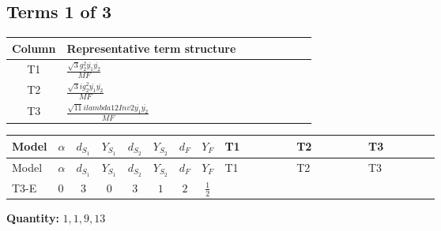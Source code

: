 \documentclass[8pt]{article}
\begin{document}
\begin{landscape}
\subsection*{Terms 1 of 3}
\begin{center}
\begin{tabular}{@{}c >{\raggedright\arraybackslash}p{0.82\linewidth}@{}}
\toprule
Column & Representative term structure \\
\midrule
T1 & \(\displaystyle \frac{\sqrt{3} g_{2}^{2} \overline{y_{1}} \overline{y_{2}}}{MF}\) \\
\midrule
T2 & \(\displaystyle \frac{\sqrt{3} i g_{2}^{2} \overline{y_{1}} \overline{y_{2}}}{MF}\) \\
\midrule
T3 & \(\displaystyle \frac{\sqrt{11} i lambda12Inv2 \overline{y_{1}} \overline{y_{2}}}{MF}\) \\
\midrule
\bottomrule
\end{tabular}
\end{center}
\smallskip
\tiny
\begin{longtable}{@{}llcccccc >{\raggedright\arraybackslash}p{0.21\linewidth} >{\raggedright\arraybackslash}p{0.21\linewidth} >{\raggedright\arraybackslash}p{0.21\linewidth}@{}}
\toprule
Model & $\alpha$ & $d_{S_1}$ & $Y_{S_1}$ & $d_{S_2}$ & $Y_{S_2}$ & $d_F$ & $Y_F$ & T1 & T2 & T3 \\
\midrule
\endfirsthead
\toprule
Model & $\alpha$ & $d_{S_1}$ & $Y_{S_1}$ & $d_{S_2}$ & $Y_{S_2}$ & $d_F$ & $Y_F$ & T1 & T2 & T3 \\
\midrule
\endhead
T3-E & $0$ & $3$ & $0$ & $3$ & $1$ & $2$ & $\frac{1}{2}$ & \scriptsize\adjustbox{max width=\linewidth}{$\begin{gathered} - \frac{\sqrt{3} g_{2}^{2} \overline{y_{1}} \overline{y_{2}}}{6 MF}\end{gathered}$} & \scriptsize\adjustbox{max width=\linewidth}{$\begin{gathered} - \frac{49 \sqrt{3} i g_{2}^{2} \overline{y_{1}} \overline{y_{2}}}{24 MF}\end{gathered}$} & \scriptsize\adjustbox{max width=\linewidth}{$\begin{gathered} - \frac{3 \sqrt{11} i lambda12Inv2 \overline{y_{1}} \overline{y_{2}}}{22 MF}\end{gathered}$} \\
\midrule
\bottomrule
\end{longtable}
\clearpage
\noindent\textbf{Quantity: }$\mathrm{1,1,9,13}$\par\smallskip

\end{landscape}
\end{document}
